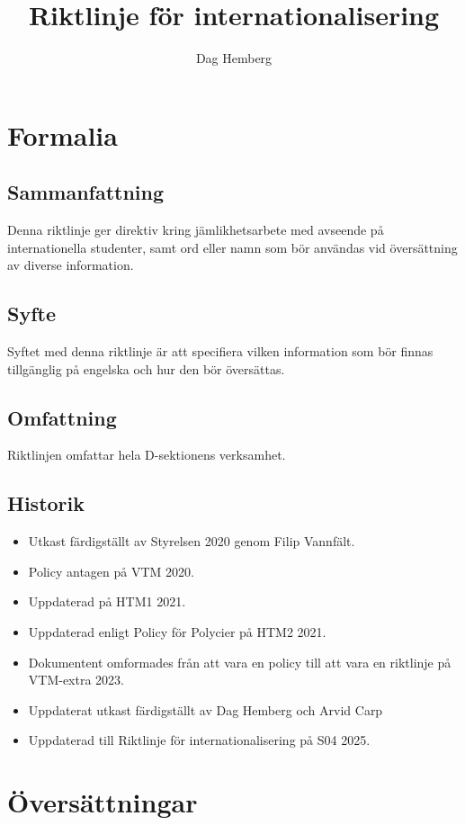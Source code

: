 \documentclass{dsekprotokoll}
\title{Riktlinje för internationalisering}
\author{Dag Hemberg}
\begin{document}
\maketitle

\section{Formalia}
\subsection{Sammanfattning}
Denna riktlinje ger direktiv kring jämlikhetsarbete med avseende på internationella studenter, samt ord eller namn som bör användas vid översättning av diverse information.

\subsection{Syfte}
Syftet med denna riktlinje är att specifiera vilken information som bör finnas tillgänglig på engelska och hur den bör översättas.

\subsection{Omfattning}
Riktlinjen omfattar hela D-sektionens verksamhet.

\subsection{Historik}
\begin{itemize}
    \item Utkast färdigställt av Styrelsen 2020 genom Filip Vannfält.
    \item Policy antagen på VTM 2020.
    \item Uppdaterad på HTM1 2021.
    \item Uppdaterad enligt Policy för Polycier på HTM2 2021.
    \item Dokumentent omformades från att vara en policy till att vara en riktlinje på VTM-extra 2023.
    \item Uppdaterat utkast färdigställt av Dag Hemberg och Arvid Carp
    \item Uppdaterad till Riktlinje för internationalisering på S04 2025.
\end{itemize}

\pagebreak

\section{Översättningar}
\end{document}
